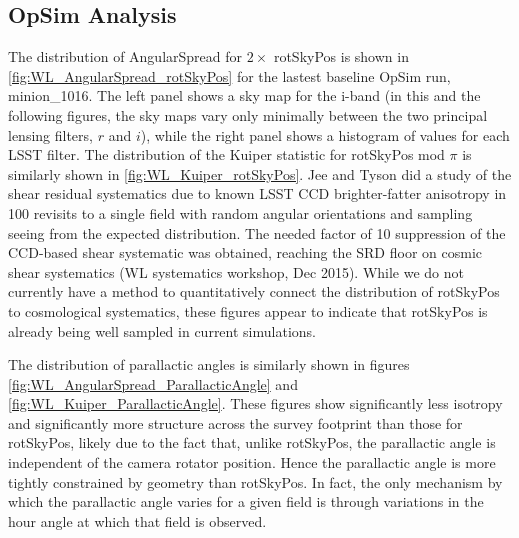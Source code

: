 \subsection{OpSim Analysis}

The distribution of AngularSpread for $2 \times$ rotSkyPos is shown in
\autoref{fig:WL_AngularSpread_rotSkyPos} for the lastest baseline OpSim run,
minion\_1016.  The left panel shows a sky map for the i-band (in this and the
following figures, the sky maps vary only minimally between the two principal
lensing filters, $r$ and $i$), while the right panel shows a histogram of values
for each LSST filter.  The distribution of the Kuiper statistic for rotSkyPos
mod $\pi$ is similarly shown in \autoref{fig:WL_Kuiper_rotSkyPos}. Jee and Tyson
did a study of the shear residual systematics due to known LSST CCD
brighter-fatter anisotropy in 100 revisits to a single field with random angular
orientations and sampling seeing from the expected distribution.  The needed
factor of 10 suppression of the CCD-based shear systematic was obtained,
reaching the SRD floor on cosmic shear systematics (WL systematics workshop, Dec
2015).    While we do not currently have a method to quantitatively connect the
distribution of rotSkyPos to cosmological systematics, these figures appear to
indicate that rotSkyPos is already being well sampled in current simulations.

The distribution of parallactic angles is similarly shown in figures
\autoref{fig:WL_AngularSpread_ParallacticAngle} and
\autoref{fig:WL_Kuiper_ParallacticAngle}.  These figures show significantly less
isotropy and significantly more structure across the survey footprint than those
for rotSkyPos, likely due to the fact that, unlike rotSkyPos, the parallactic
angle is independent of the camera rotator position.  Hence the parallactic
angle is more tightly constrained by geometry than rotSkyPos.  In fact, the only
mechanism by which the parallactic angle varies for a given field is through
variations in the hour angle at which that field is observed.






